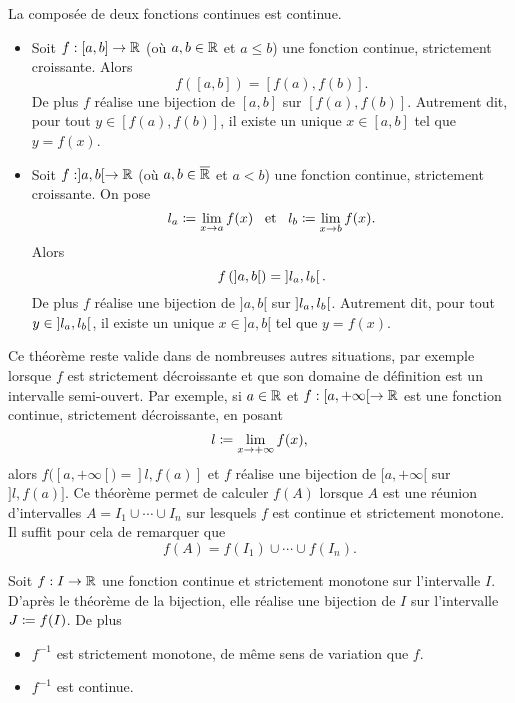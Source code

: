 \documentclass{magnolia}
\begin{document}
\begin{proposition}[utile=-3, nom={Théorèmes usuels}]
La composée de deux fonctions continues est continue.
\end{proposition}

\begin{theoreme}[nom={Théorème de la bijection}]
\begin{itemize}
\item Soit $f:[a,b]\to\mathbb{R}$ (où $a,b\in\mathbb{R}$ et $a\leq b$) une fonction continue, strictement croissante. Alors \[f([a,b])=[f(a),f(b)].\]
De plus $f$ réalise une bijection de $[a,b]$ sur
$[f(a),f(b)]$. Autrement dit, pour tout $y\in[f(a),f(b)]$, il existe un unique 
$x\in[a,b]$ tel que $y=f(x)$.
\item Soit $f:]a,b[\to\mathbb{R}$ (où $a,b\in\overline{\mathbb{R}}$ et $a<b$) une fonction continue, strictement croissante.
  On pose
  \[l_a\coloneqq\lim_{x\to a} f(x) \quad\!\text{et}\quad\! l_b\coloneqq\lim_{x\to b} f(x).\]
Alors
\[f\left(\left]a,b\right[\right)=\left]l_a,l_b\right[.\]
De plus $f$ réalise une bijection de $]a,b[$ sur $\left]l_a,l_b\right[$. Autrement dit,
pour tout $y\in\left]l_a,l_b\right[$, il existe un unique $x\in]a,b[$ tel que
$y=f(x)$.
\end{itemize}
\end{theoreme}

\begin{remarques}
\remarque Ce théorème reste valide dans de nombreuses autres situations, par exemple
  lorsque $f$ est strictement décroissante et
  que son domaine de définition est un intervalle semi-ouvert. Par exemple, si $a\in\mathbb{R}$
  et $f:[a,+\infty[\to\mathbb{R}$ est une fonction continue, strictement décroissante, en
  posant
  \[l\coloneqq\lim_{x\to +\infty} f(x),\]
  alors $f([a,+\infty[)=]l,f(a)]$ et  $f$ réalise une bijection de $[a,+\infty[$ sur $]l,f(a)]$.
\remarque Ce théorème permet
  de calculer $f(A)$ lorsque $A$ est une réunion d'intervalles
  $A=I_1\cup\cdots\cup I_n$ sur lesquels $f$ est continue et strictement monotone.
  Il suffit pour cela de remarquer que
  \[f(A)=f(I_1)\cup\cdots \cup f(I_n).\]
\end{remarques}

\begin{proposition}
Soit $f:I\to\mathbb{R}$ une fonction continue et strictement monotone sur l'intervalle $I$.
D'après le théorème de la bijection, elle réalise une bijection de $I$ sur
l'intervalle $J\coloneqq f(I)$. De plus
\begin{itemize}
\item $f^{-1}$ est strictement monotone, de même sens de variation que $f$. 
\item $f^{-1}$ est continue.
\end{itemize}
\end{proposition}
\end{document}
